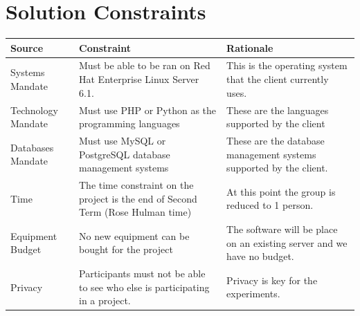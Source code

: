 \section{Solution Constraints}
\begin{table}[!h]
    \begin{tabular}{|l|p{5.5cm}|p{5.5cm}|}
        \hline
        Source & Constraint & Rationale \\
        \hline
        Systems Mandate & Must be able to be ran on Red Hat Enterprise Linux Server 6.1. & This is the operating system that the client currently uses. \\
        \hline
        Technology Mandate & Must use PHP or Python as the programming languages & These are the languages supported by the client \\
        \hline
        Databases Mandate & Must use MySQL or PostgreSQL database management systems & These are the database management systems supported by the client. \\
        \hline
        Time  & The time constraint on the project is the end of Second Term (Rose Hulman time) & At this point the group is reduced to 1 person. \\
        \hline
        Equipment Budget & No new equipment can be bought for the project & The software will be place on an existing server and we have no budget. \\
        \hline
        Privacy & Participants must not be able to see who else is participating in a project. & Privacy is key for the experiments. \\
        \hline
    \end{tabular}
\end{table}

\renewcommand\refname{\section{References}}{\vspace*{-12mm}}





